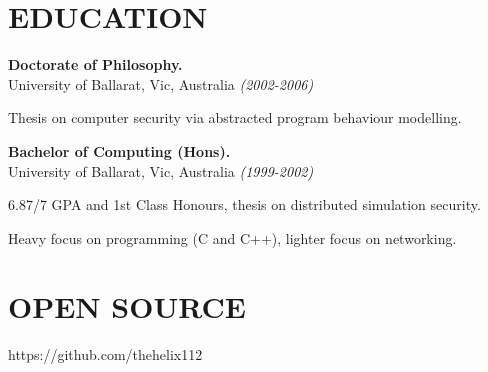 \documentclass[margin]{res}
\begin{document}
\begin{resume}




\section{EDUCATION}

{\bf Doctorate of Philosophy.} \\
University of Ballarat, Vic, Australia {\em (2002-2006)}
\begin{list}{}{\leftmargin=1.5em \topsep=5pt \partopsep=0pt \parsep=2.5pt}
  \item Thesis on computer security via abstracted program behaviour modelling.
\end{list}

{\bf Bachelor of Computing (Hons).} \\
University of Ballarat, Vic, Australia {\em (1999-2002)}
\begin{list}{}{\leftmargin=1.5em \topsep=5pt \partopsep=0pt \parsep=2.5pt}
  \item 6.87/7 GPA and 1st Class Honours, thesis on distributed simulation security.
  \item Heavy focus on programming (C and C++), lighter focus on networking.
\end{list}


\section{OPEN SOURCE}
https://github.com/thehelix112


\end{resume}
\end{document}
